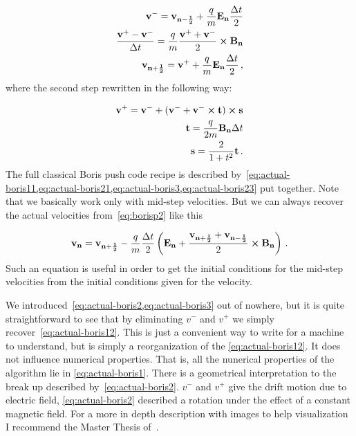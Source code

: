 \documentclass[12pt, class=report, crop=false]{standalone}
\begin{document}
\begin{subequations}
\label{eq:actual-boris2}
  \begin{align}
    \label{eq:actual-boris21}
    \vb{v^-} = \vb{v_{n-\frac{1}{2}}} + \frac{q}{m} \vb{E_n} \frac{\Delta t}{2}\\
    \label{eq:actual-boris22}
    \frac{\vb{v^+} - \vb{v^-} }{\Delta t} = \frac{q}{m} \frac{\vb{v^+} + \vb{v^-} }{2} \cp \vb{B_n}\\
    \label{eq:actual-boris23}
    \vb{v_{n+\frac{1}{2}}} = \vb{v^+} + \frac{q}{m} \vb{E_n} \frac{\Delta t}{2}\,,
  \end{align}
\end{subequations}
where the second step rewritten in the following way:

\begin{subequations}
\label{eq:actual-boris3}
  \begin{align}
    \vb{v^+} = \vb{v^-} + (\vb{v^-} + \vb{v^-} \cp \vb{t}) \cp \vb{s}\\
    \vb{t} = \frac{q}{2m} \vb{B_n} \Delta t\\
    \vb{s} = \frac{2}{1+t^2} \vb{t}\,.
  \end{align}
\end{subequations}
The full classical Boris push code recipe is described by~\cref{eq:actual-boris11,eq:actual-boris21,eq:actual-boris3,eq:actual-boris23} put together. Note that we basically work only with mid-step velocities. But we can always recover the actual velocities from~\cref{eq:borisp2} like this

\begin{equation}
  \vb{v_n} = \vb{v_{n+\frac{1}{2}}} - \frac{q}{m} \frac{\Delta t}{2} \left(\vb{E_n} + \frac{\vb{v_{n+\frac{1}{2}}} + \vb{v_{n-\frac{1}{2}}}}{2} \cp \vb{B_n} \right)\,.
\end{equation}
Such an equation is useful in order to get the initial conditions for the mid-step velocities from the initial conditions given for the velocity.

We introduced~\cref{eq:actual-boris2,eq:actual-boris3} out of nowhere, but it is quite straightforward to see that by eliminating \(v^-\) and \(v^+\) we simply recover~\cref{eq:actual-boris12}. This is just a convenient way to write for a machine to understand, but is simply a reorganization of the \cref{eq:actual-boris12}. It does not influence numerical properties. That is, all the nunerical properties of the algorithm lie in \cref{eq:actual-boris1}. There is a geometrical interpretation to the break up described by~\cref{eq:actual-boris2}. \(v^-\) and \(v^+\) give the drift motion due to electric field, \cref{eq:actual-boris2} described a rotation under the effect of a constant magnetic field. For a more in depth description with images to help visualization I recommend the Master Thesis of~\cite{micluta-campeanuLaserWakefieldAcceleration2019}.
\end{document}
